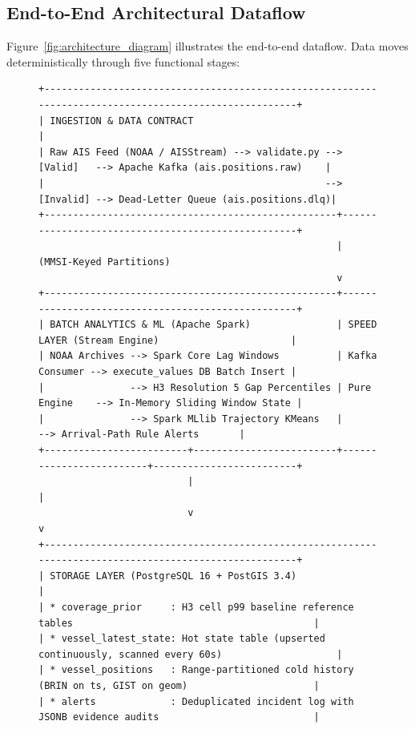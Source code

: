 \documentclass[10pt,twocolumn,a4paper]{article}
\begin{document}
\subsection{End-to-End Architectural Dataflow}
Figure~\ref{fig:architecture_diagram} illustrates the end-to-end dataflow. Data moves deterministically through five functional stages:

\begin{figure}[t]
\centering
\begin{minipage}{0.95\textwidth}
\ttfamily\scriptsize
\begin{verbatim}
+-------------------------------------------------------------------------------------------------------+
| INGESTION & DATA CONTRACT                                                                             |
| Raw AIS Feed (NOAA / AISStream) --> validate.py --> [Valid]   --> Apache Kafka (ais.positions.raw)    |
|                                                 --> [Invalid] --> Dead-Letter Queue (ais.positions.dlq)|
+---------------------------------------------------+---------------------------------------------------+
                                                    | (MMSI-Keyed Partitions)
                                                    v
+---------------------------------------------------+---------------------------------------------------+
| BATCH ANALYTICS & ML (Apache Spark)               | SPEED LAYER (Stream Engine)                       |
| NOAA Archives --> Spark Core Lag Windows          | Kafka Consumer --> execute_values DB Batch Insert |
|               --> H3 Resolution 5 Gap Percentiles | Pure Engine    --> In-Memory Sliding Window State |
|               --> Spark MLlib Trajectory KMeans   |                --> Arrival-Path Rule Alerts       |
+-------------------------+-------------------------+-------------------------+-------------------------+
                          |                                                   |
                          v                                                   v
+-------------------------------------------------------------------------------------------------------+
| STORAGE LAYER (PostgreSQL 16 + PostGIS 3.4)                                                           |
| * coverage_prior     : H3 cell p99 baseline reference tables                                          |
| * vessel_latest_state: Hot state table (upserted continuously, scanned every 60s)                    |
| * vessel_positions   : Range-partitioned cold history (BRIN on ts, GIST on geom)                      |
| * alerts             : Deduplicated incident log with JSONB evidence audits                           |

\end{verbatim}
\end{minipage}
\end{figure}
\end{document}
